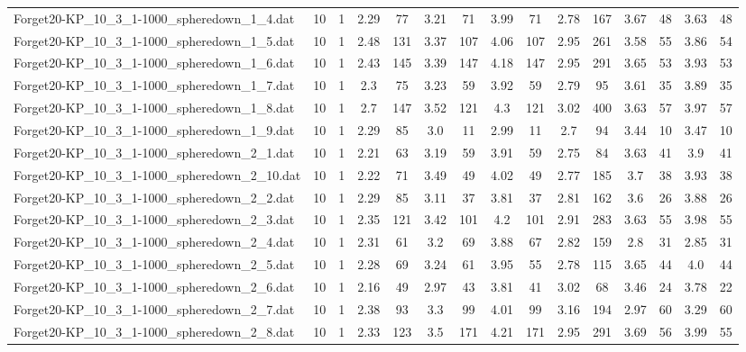 \begin{table}[!ht]
{\begin{tabular}{lcccccccccccccc}
Forget20-KP\_10\_3\_1-1000\_spheredown\_1\_4.dat & 10 & 1 & 2.29 & 77 & 3.21 & 71 & 3.99 & 71 & 2.78 & 167 & 3.67 & 48 & 3.63 & 48 \\
Forget20-KP\_10\_3\_1-1000\_spheredown\_1\_5.dat & 10 & 1 & 2.48 & 131 & 3.37 & 107 & 4.06 & 107 & 2.95 & 261 & 3.58 & 55 & 3.86 & 54 \\
Forget20-KP\_10\_3\_1-1000\_spheredown\_1\_6.dat & 10 & 1 & 2.43 & 145 & 3.39 & 147 & 4.18 & 147 & 2.95 & 291 & 3.65 & 53 & 3.93 & 53 \\
Forget20-KP\_10\_3\_1-1000\_spheredown\_1\_7.dat & 10 & 1 & 2.3 & 75 & 3.23 & 59 & 3.92 & 59 & 2.79 & 95 & 3.61 & 35 & 3.89 & 35 \\
Forget20-KP\_10\_3\_1-1000\_spheredown\_1\_8.dat & 10 & 1 & 2.7 & 147 & 3.52 & 121 & 4.3 & 121 & 3.02 & 400 & 3.63 & 57 & 3.97 & 57 \\
Forget20-KP\_10\_3\_1-1000\_spheredown\_1\_9.dat & 10 & 1 & 2.29 & 85 & 3.0 & 11 & 2.99 & 11 & 2.7 & 94 & 3.44 & 10 & 3.47 & 10 \\
Forget20-KP\_10\_3\_1-1000\_spheredown\_2\_1.dat & 10 & 1 & 2.21 & 63 & 3.19 & 59 & 3.91 & 59 & 2.75 & 84 & 3.63 & 41 & 3.9 & 41 \\
Forget20-KP\_10\_3\_1-1000\_spheredown\_2\_10.dat & 10 & 1 & 2.22 & 71 & 3.49 & 49 & 4.02 & 49 & 2.77 & 185 & 3.7 & 38 & 3.93 & 38 \\
Forget20-KP\_10\_3\_1-1000\_spheredown\_2\_2.dat & 10 & 1 & 2.29 & 85 & 3.11 & 37 & 3.81 & 37 & 2.81 & 162 & 3.6 & 26 & 3.88 & 26 \\
Forget20-KP\_10\_3\_1-1000\_spheredown\_2\_3.dat & 10 & 1 & 2.35 & 121 & 3.42 & 101 & 4.2 & 101 & 2.91 & 283 & 3.63 & 55 & 3.98 & 55 \\
Forget20-KP\_10\_3\_1-1000\_spheredown\_2\_4.dat & 10 & 1 & 2.31 & 61 & 3.2 & 69 & 3.88 & 67 & 2.82 & 159 & 2.8 & 31 & 2.85 & 31 \\
Forget20-KP\_10\_3\_1-1000\_spheredown\_2\_5.dat & 10 & 1 & 2.28 & 69 & 3.24 & 61 & 3.95 & 55 & 2.78 & 115 & 3.65 & 44 & 4.0 & 44 \\
Forget20-KP\_10\_3\_1-1000\_spheredown\_2\_6.dat & 10 & 1 & 2.16 & 49 & 2.97 & 43 & 3.81 & 41 & 3.02 & 68 & 3.46 & 24 & 3.78 & 22 \\
Forget20-KP\_10\_3\_1-1000\_spheredown\_2\_7.dat & 10 & 1 & 2.38 & 93 & 3.3 & 99 & 4.01 & 99 & 3.16 & 194 & 2.97 & 60 & 3.29 & 60 \\
Forget20-KP\_10\_3\_1-1000\_spheredown\_2\_8.dat & 10 & 1 & 2.33 & 123 & 3.5 & 171 & 4.21 & 171 & 2.95 & 291 & 3.69 & 56 & 3.99 & 55 \\

\end{tabular}}
\end{table}
